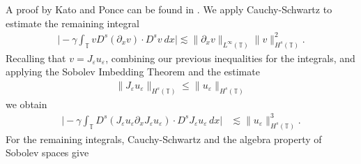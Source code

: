 \documentclass{beamer}
\newcommand{\p}{\partial}
\newcommand{\ci}{\mathbb{T}}
\newcommand{\ee}{\varepsilon}
\begin{document}
\begin{frame}
	
	A proof by Kato and Ponce can be found in \cite{Kato_1988_Commutator-esti}.
We apply Cauchy-Schwartz
to estimate the remaining integral
%
%
%
%
%
\begin{equation*} \label{int1-est-calc5}
\begin{split}
\Big|
-\gamma \int_\ci
v D^s (\p_x v)
\cdot  D^s v \ dx
\Big|
\lesssim \| \p_x v \|_{L^\infty(\ci)} \| v \|_{H^s(\ci)}^2.
\end{split}
\end{equation*}
%
%
%
%
%
Recalling that $v = J_\ee u_\ee$, combining our previous inequalities for 
the integrals, and applying the Sobolev Imbedding Theorem and the 
estimate
%
%
\begin{equation*}
	\begin{split}
		\|J_\ee u_\ee \|_{H^s(\ci)} \le \|u_\ee\|_{H^s(\ci)}	\end{split}
\end{equation*}
%
%
we obtain
%
%
%
\begin{equation*} \label{burgers_est'}
\begin{split}
\Big|
-\gamma \int_\ci
D^s(J_\ee u_\ee \partial_x J_\ee u_\ee) \cdot   D^s J_\ee u_\ee \, dx  
\Big|
& \lesssim \| u_\ee \|_{H^s(\ci)}^3.
\end{split}
\end{equation*}
%
%
%
For the remaining integrals, 
Cauchy-Schwartz and the algebra property of Sobolev spaces give 
%
%
\end{frame}
\end{document}
